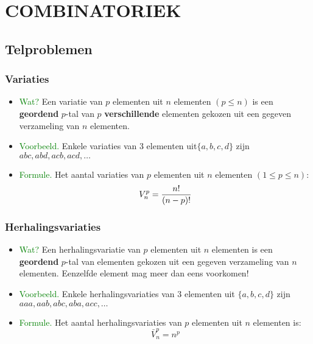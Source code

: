 \hypertarget{combinatoriek}{}
\section{COMBINATORIEK} \label{combinatoriek}

\hypertarget{telproblemen}{}
\subsection{Telproblemen} \label{telproblemen}

\hypertarget{variaties}{}
\subsubsection{Variaties} \label{variaties}
\begin{itemize}
\item \textcolor{green}{Wat?}\newline
Een variatie van $p$ elementen uit $n$ elementen $(p\leq n )$ is een {\bf geordend} $p$-tal van $p$ {\bf verschillende } elementen gekozen uit een gegeven verzameling van $n$ elementen.
\item \textcolor{green}{Voorbeeld.} \newline
Enkele variaties van 3 elementen uit$\{a, b, c, d\}$ zijn $abc, abd, acb, acd, \ldots$
\item \textcolor{green}{Formule.} \newline
Het aantal variaties van $p$ elementen uit $n$ elementen $(1\leq p\leq n)$:
\[V^p_n = \displaystyle \frac{\displaystyle n!}{\displaystyle (n-p)!}\]
\end{itemize}

\hypertarget{herhalingsvariaties}{}
\subsubsection{Herhalingsvariaties} \label{herhalingsvariaties}
\begin{itemize}
\item \textcolor{green}{Wat?} \newline
Een herhalingsvariatie van $p$ elementen uit $n$ elementen is een {\bf geordend} $p$-tal van elementen gekozen uit een gegeven verzameling van $n$ elementen. Eenzelfde element mag meer dan eens voorkomen!
\item \textcolor{green}{Voorbeeld.} \newline
Enkele herhalingsvariaties van 3 elementen uit $\{a, b, c, d\}$ zijn $aaa, aab, abc, aba, acc, \ldots$
\item \textcolor{green}{Formule.} \newline
Het aantal herhalingsvariaties van $p$ elementen uit $n$ elementen is:
\[\bar{V}^p_n=n^p\]
\end{itemize}

